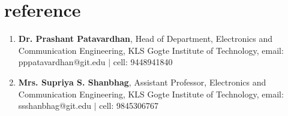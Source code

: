 \documentclass[10pt]{article}
\begin{document}
\section*{reference}
\begin{enumerate}
\item \textbf{Dr. Prashant Patavardhan}, 
Head of Department, Electronics and Communication Engineering, 
KLS Gogte Institute of Technology, 
email: pppatavardhan@git.edu $|$ cell: 9448941840
\item\textbf{Mrs. Supriya S. Shanbhag}, Assistant Professor,  Electronics and Communication Engineering, 
KLS Gogte Institute of Technology, 
email: ssshanbhag@git.edu $|$ cell: 9845306767
\end{enumerate}
\end{document}

